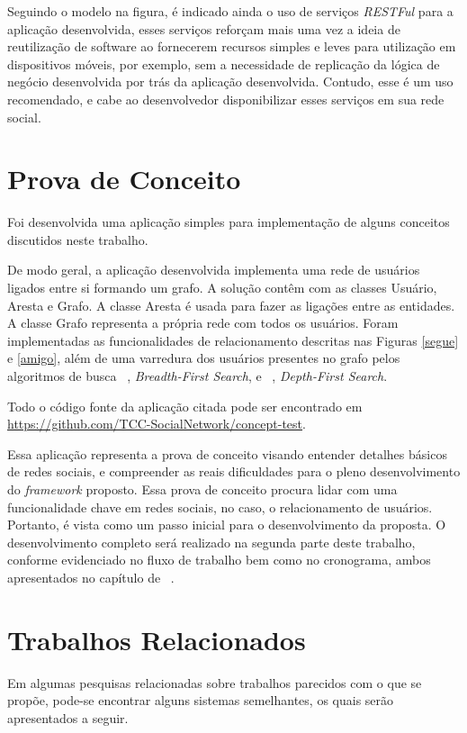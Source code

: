 Seguindo o modelo na figura, é indicado ainda o uso de serviços \textit{RESTFul} para a aplicação desenvolvida, esses serviços reforçam mais uma vez a ideia de reutilização de software ao fornecerem recursos simples e leves para utilização em dispositivos móveis, por exemplo, sem a necessidade de replicação da lógica de negócio desenvolvida por trás da aplicação desenvolvida. Contudo, esse é um uso recomendado, e cabe ao desenvolvedor disponibilizar esses serviços em sua rede social.

\section{Prova de Conceito}

Foi desenvolvida uma aplicação simples para implementação de alguns conceitos discutidos neste trabalho.

De modo geral, a aplicação desenvolvida implementa uma rede de usuários ligados entre si formando um grafo. A solução contêm com as classes Usuário, Aresta e Grafo. A classe Aresta é usada para fazer as ligações entre as entidades. A classe Grafo representa a própria rede com todos os usuários. Foram implementadas as funcionalidades de relacionamento descritas nas Figuras \ref{segue} e \ref{amigo}, além de uma varredura dos usuários presentes no grafo pelos algoritmos de busca ~, \textit{Breadth-First Search}, e ~, \textit{Depth-First Search}.

Todo o código fonte da aplicação citada pode ser encontrado em \url{https://github.com/TCC-SocialNetwork/concept-test}.

Essa aplicação representa a prova de conceito visando entender detalhes básicos de redes sociais, e compreender as reais dificuldades para o pleno desenvolvimento do \textit{framework} proposto. Essa prova de conceito procura lidar com uma funcionalidade chave em redes sociais, no caso, o relacionamento de usuários. Portanto, é vista como um passo inicial para o desenvolvimento da proposta. O desenvolvimento completo será realizado na segunda parte deste trabalho, conforme evidenciado no fluxo de trabalho bem como no cronograma, ambos apresentados no capítulo de ~.

\section{Trabalhos Relacionados}

Em algumas pesquisas relacionadas sobre trabalhos parecidos com o que se propõe, pode-se encontrar alguns sistemas semelhantes, os quais serão apresentados a seguir.

